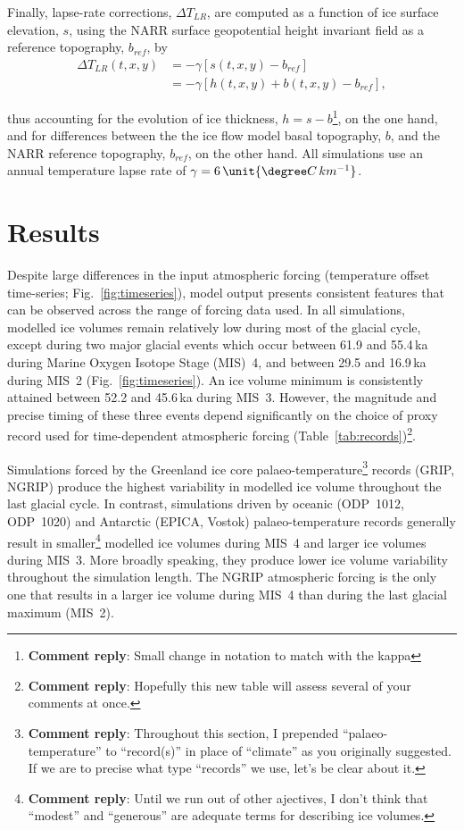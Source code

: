 \documentclass[tc, manuscript]{copernicus}
\newcommand{\renote}[1]{\footnote{\textbf{Comment reply}: #1}}
\begin{document}
Finally, lapse-rate corrections, ${\Delta}T_{LR}$, are computed as a function
of ice surface elevation, $s$, using the NARR surface geopotential height
invariant field as a reference topography, $b_{ref}$, by
\begin{align}
    {\Delta}T_{LR}(t, x, y) &= -\gamma [s(t, x, y)-b_{ref}] \\
                            &= -\gamma [h(t, x, y)+b(t, x, y)-b_{ref}],
\end{align}

thus accounting for the evolution of ice thickness, ${h=s-b}$\renote{
    Small change in notation to match with the kappa},
on the one hand, and
for differences between the the ice flow model basal topography, $b$, and the
NARR reference topography, $b_{ref}$, on the other hand. All simulations use an
annual temperature lapse rate of $\gamma = 6\,\unit{{\degree}C\,km^{-1}}$.

\section{Results}
\label{sec:results}

Despite large differences in the input atmospheric forcing (temperature offset
time-series; Fig.~\ref{fig:timeseries}), model output presents consistent
features that can be observed across the range of forcing data used. In all
simulations, modelled ice volumes remain relatively low during most of the
glacial cycle, except during two major glacial events which occur between 61.9
and 55.4\,ka during Marine Oxygen Isotope Stage (MIS)~4, and between 29.5 and
16.9\,ka during MIS~2 (Fig.~\ref{fig:timeseries}). An ice volume minimum is
consistently attained between 52.2 and 45.6\,ka during MIS~3. However, the
magnitude and precise timing of these three events depend significantly on the
choice of proxy record used for time-dependent atmospheric forcing
(Table~\ref{tab:records})\renote{
    Hopefully this new table will assess several of your comments at once.}.

Simulations forced by the Greenland ice core palaeo-temperature\renote{
    Throughout this section, I prepended ``palaeo-temperature'' to
    ``record(s)'' in place of ``climate'' as you originally suggested. If we
    are to precise what type ``records'' we use, let's be clear about it.}
records (GRIP, NGRIP) produce the highest variability in modelled ice volume
throughout the last glacial cycle. In contrast, simulations driven by oceanic
(ODP~1012, ODP~1020) and Antarctic (EPICA, Vostok) palaeo-temperature records
generally result in smaller\renote{
    Until we run out of other ajectives, I don't think that ``modest'' and
    ``generous'' are adequate terms for describing ice volumes.}
modelled ice volumes during MIS~4 and larger ice volumes during MIS~3.
More broadly speaking, they produce lower ice volume variability
throughout the simulation length. The NGRIP atmospheric forcing is the only one
that results in a larger ice volume during MIS~4 than during the last glacial
maximum (MIS~2).
\end{document}
